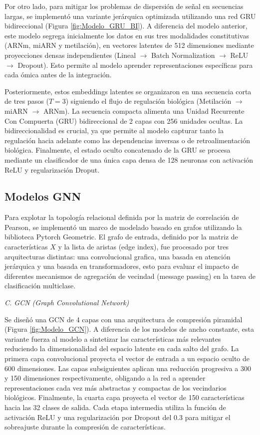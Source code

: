 \documentclass[preprint,number]{elsarticle}
\begin{document}
Por otro lado, para mitigar los problemas de dispersión de señal en secuencias largas, se implementó una variante jerárquica optimizada utilizando una red GRU bidireccional (Figura \ref{fig:Modelo_GRU_BI}). A diferencia del modelo anterior, este modelo segrega inicialmente los datos en sus tres modalidades constitutivas (ARNm, miARN y metilación), en vectores latentes de 512 dimensiones mediante proyecciones densas independientes (Lineal $\rightarrow$ Batch Normalization $\rightarrow$ ReLU $\rightarrow$ Dropout). Esto permite al modelo aprender representaciones específicas para cada ómica antes de la integración. 

Posteriormente, estos embeddings latentes se organizaron en una secuencia corta de tres pasos ($T=3$) siguiendo el flujo de regulación biológica (Metilación $\rightarrow$ miARN $\rightarrow$ ARNm). La secuencia compacta alimenta una Unidad Recurrente Con Compuerta (GRU) bidireccional de 2 capas con 256 unidades ocultas. La bidireccionalidad es crucial, ya que permite al modelo capturar tanto la regulación hacia adelante como las dependencias inversas o de retroalimentación biológica. Finalmente, el estado oculto concatenado de la GRU se procesa mediante un clasificador de una única capa densa de 128 neuronas con activación ReLU y regularización Droput.



\subsection{Modelos GNN}

Para explotar la topología relacional definida por la matriz de correlación de Pearson, se implementó un marco de modelado basado en grafos utilizando la biblioteca Pytorch Geometric. El grafo de entrada, definido por la matriz de características $X$ y la lista de aristas (edge index), fue procesado por tres arquitecturas distintas: una convolucional grafica, una basada en atención jerárquica y una basada en transformadores, esto para evaluar el impacto de diferentes mecanismos de agregación de vecindad (message passing) en la tarea de clasificación multiclase.

\textit{C. GCN (Graph Convolutional Network)}

Se diseñó una GCN de 4 capas con una arquitectura de compresión piramidal (Figura \ref{fig:Modelo_GCN}). A diferencia de los modelos de ancho constante, esta variante fuerza al modelo a sintetizar  las características más relevantes reduciendo la dimensionalidad del espacio latente en cada salto del grafo. La primera  capa convolucional proyecta el vector de entrada a un espacio oculto de 600 dimensiones. Las capas subsiguientes aplican una reducción progresiva a 300 y 150 dimensiones respectivamente, obligando a la red a aprender representaciones cada vez más abstractas y compactas de los vecindarios biológicos. Finalmente, la cuarta capa proyecta el vector de 150 características hacia las 32 clases de salida. Cada etapa intermedia utiliza la función de activación ReLU y una regularización por Dropout del 0.3 para mitigar el sobreajuste durante la compresión de características.
\end{document}

